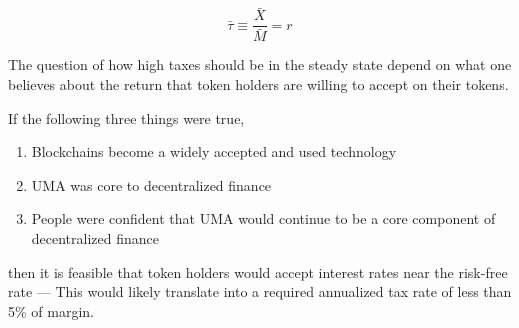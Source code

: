 $$\bar{\tau} \equiv \frac{\bar{X}}{\bar{M}} = r$$

The question of how high taxes should be in the steady state depend on what one believes about the
return that token holders are willing to accept on their tokens.

If the following three things were true,

\begin{enumerate}
  \item Blockchains become a widely accepted and used technology
  \item UMA was core to decentralized finance
  \item People were confident that UMA would continue to be a core component of decentralized finance
\end{enumerate}

then it is feasible that token holders would accept interest rates near the risk-free rate --- This
would likely translate into a required annualized tax rate of less than 5\% of margin.
